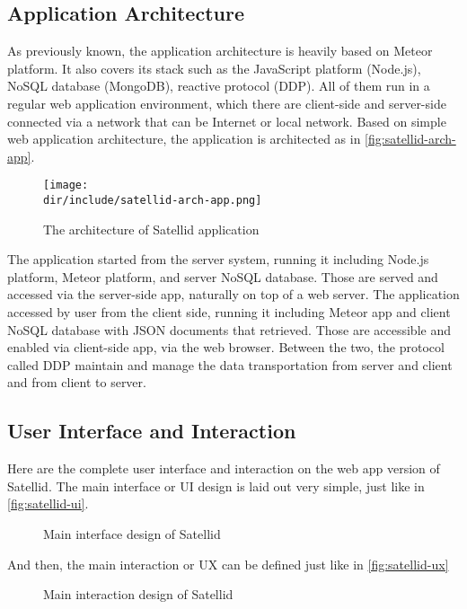 \subsection{Application Architecture}

As previously known, the application architecture is heavily based on Meteor platform.
It also covers its stack such as the JavaScript platform (Node.js), NoSQL database (MongoDB), reactive protocol (DDP).
All of them run in a regular web application environment, which there are client-side and server-side connected via a network that can be Internet or local network.
Based on simple web application architecture, the application is architected as in \autoref{fig:satellid-arch-app}.

\begin{figure}[htbp]
    \centering
    \texttt{[image: \\dir/include/satellid-arch-app.png]}
    \caption[Satellid Application Architecture]{The architecture of Satellid application}
    \label{fig:satellid-arch-app}
\end{figure}

The application started from the server system, running it including Node.js platform, Meteor platform, and server NoSQL database.
Those are served and accessed via the server-side app, naturally on top of a web server.
The application accessed by user from the client side, running it including Meteor app and client NoSQL database with \ac{JSON} documents that retrieved.
Those are accessible and enabled via client-side app, via the web browser.
Between the two, the protocol called \ac{DDP} maintain and manage the data transportation from server and client and from client to server.

\subsection{User Interface and Interaction}

Here are the complete user interface and interaction on the web app version of Satellid.
The main interface or \ac{UI} design is laid out very simple, just like in \autoref{fig:satellid-ui}.

\begin{figure}[htb]
    \centering
    \caption{Main interface design of Satellid}
    \label{fig:satellid-ui}
\end{figure}

And then, the main interaction or \ac{UX} can be defined just like in \autoref{fig:satellid-ux}

\begin{figure}[htb]
    \centering
    \caption{Main interaction design of Satellid}
    \label{fig:satellid-ux}
\end{figure}

